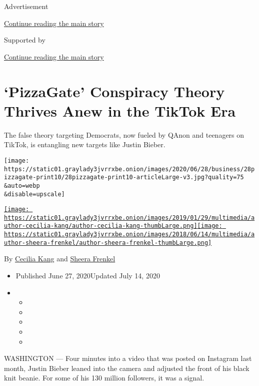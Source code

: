 Advertisement

\protect\hyperlink{after-top}{Continue reading the main story}

Supported by

\protect\hyperlink{after-sponsor}{Continue reading the main story}

\hypertarget{pizzagate-conspiracy-theory-thrives-anew-in-the-tiktok-era}{%
\section{`PizzaGate' Conspiracy Theory Thrives Anew in the TikTok
Era}\label{pizzagate-conspiracy-theory-thrives-anew-in-the-tiktok-era}}

The false theory targeting Democrats, now fueled by QAnon and teenagers
on TikTok, is entangling new targets like Justin Bieber.

\texttt{[image: https://static01.graylady3jvrrxbe.onion/images/2020/06/28/business/28pizzagate-print10/28pizzagate-print10-articleLarge-v3.jpg?quality=75\\\&auto=webp\\\&disable=upscale]}

\href{https://www.nytimes3xbfgragh.onion/by/cecilia-kang}{\texttt{[image: https://static01.graylady3jvrrxbe.onion/images/2019/01/29/multimedia/author-cecilia-kang/author-cecilia-kang-thumbLarge.png]}}\href{https://www.nytimes3xbfgragh.onion/by/sheera-frenkel}{\texttt{[image: https://static01.graylady3jvrrxbe.onion/images/2018/06/14/multimedia/author-sheera-frenkel/author-sheera-frenkel-thumbLarge.png]}}

By \href{https://www.nytimes3xbfgragh.onion/by/cecilia-kang}{Cecilia
Kang} and
\href{https://www.nytimes3xbfgragh.onion/by/sheera-frenkel}{Sheera
Frenkel}

\begin{itemize}
\item
  Published June 27, 2020Updated July 14, 2020
\item
  \begin{itemize}
  \item
  \item
  \item
  \item
  \item
  \end{itemize}
\end{itemize}

WASHINGTON --- Four minutes into a video that was posted on Instagram
last month, Justin Bieber leaned into the camera and adjusted the front
of his black knit beanie. For some of his 130 million followers, it was
a signal.

